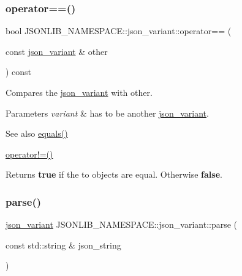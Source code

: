 \subsubsection{\texorpdfstring{operator==()}{operator==()}}
{\footnotesize\ttfamily bool J\+S\+O\+N\+L\+I\+B\+\_\+\+N\+A\+M\+E\+S\+P\+A\+C\+E\+::json\+\_\+variant\+::operator== (\begin{DoxyParamCaption}\item[{const \hyperlink{classJSONLIB__NAMESPACE_1_1json__variant}{json\+\_\+variant} \&}]{other }\end{DoxyParamCaption}) const\hspace{0.3cm}{\ttfamily [inline]}}



Compares the \hyperlink{classJSONLIB__NAMESPACE_1_1json__variant}{json\+\_\+variant} with {\ttfamily other}. 


\begin{DoxyParams}{Parameters}
{\em variant} & has to be another \hyperlink{classJSONLIB__NAMESPACE_1_1json__variant}{json\+\_\+variant}. \\
\hline
\end{DoxyParams}
\begin{DoxySeeAlso}{See also}
\hyperlink{classJSONLIB__NAMESPACE_1_1json__variant_ae68b9cb156c2b2f9e12c7f889634b63a}{equals()} 

\hyperlink{classJSONLIB__NAMESPACE_1_1json__variant_a7672a255983f3142523b3680e737d021}{operator!=()} 
\end{DoxySeeAlso}
\begin{DoxyReturn}{Returns}
{\bfseries true} if the to objects are equal. Otherwise {\bfseries false}. 
\end{DoxyReturn}
\mbox{\label{classJSONLIB__NAMESPACE_1_1json__variant_ae9198f05ef46e3ada2a10d942e8478d0}} 
\subsubsection{\texorpdfstring{parse()}{parse()}}
{\footnotesize\ttfamily \hyperlink{classJSONLIB__NAMESPACE_1_1json__variant}{json\+\_\+variant} J\+S\+O\+N\+L\+I\+B\+\_\+\+N\+A\+M\+E\+S\+P\+A\+C\+E\+::json\+\_\+variant\+::parse (\begin{DoxyParamCaption}\item[{const std\+::string \&}]{json\+\_\+string }\end{DoxyParamCaption})\hspace{0.3cm}{\ttfamily [static]}}



